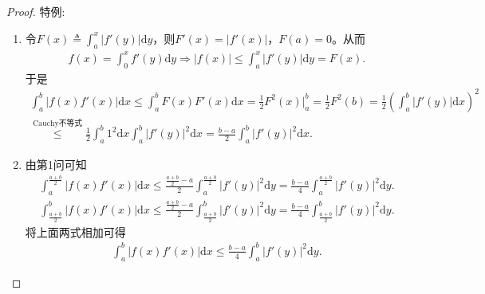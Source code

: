 \documentclass[../../main.tex]{subfiles}
\begin{document}
\begin{proof}
{\heiti 特例:}
\begin{enumerate}
\item 令\(F(x) \triangleq \int_{a}^{x}|f'(y)|\mathrm{d}y\)，则\(F'(x) = |f'(x)|\)，\(F(a) = 0\)。从而
\begin{align*}
f(x) = \int_{0}^{x}f'(y)\mathrm{d}y \Rightarrow |f(x)| \leqslant \int_{a}^{x}|f'(y)|\mathrm{d}y = F(x).
\end{align*}
于是
\begin{align*}
\int_{a}^{b}|f(x)f'(x)|\mathrm{d}x \leqslant \int_{a}^{b}F(x)F'(x)\mathrm{d}x = \frac{1}{2}F^2(x)\big|_{a}^{b} = \frac{1}{2}F^2(b) = \frac{1}{2}\left( \int_{a}^{b}|f'(y)|\mathrm{d}x \right)^2 \\
\overset{\text{Cauchy不等式}}{\leqslant} \frac{1}{2}\int_{a}^{b}1^2\mathrm{d}x \int_{a}^{b}|f'(y)|^2\mathrm{d}x = \frac{b - a}{2}\int_{a}^{b}|f'(y)|^2\mathrm{d}x.
\end{align*}

\item 由第1问可知
\begin{align*}
\int_{a}^{\frac{a + b}{2}}|f(x)f'(x)|\mathrm{d}x \leqslant \frac{\frac{a + b}{2} - a}{2}\int_{a}^{\frac{a + b}{2}}|f'(y)|^2\mathrm{d}y = \frac{b - a}{4}\int_{a}^{\frac{a + b}{2}}|f'(y)|^2\mathrm{d}y.
\end{align*}
\begin{align*}
\int_{\frac{a + b}{2}}^{b}|f(x)f'(x)|\mathrm{d}x \leqslant \frac{\frac{a + b}{2} - a}{2}\int_{\frac{a + b}{2}}^{b}|f'(y)|^2\mathrm{d}y = \frac{b - a}{4}\int_{\frac{a + b}{2}}^{b}|f'(y)|^2\mathrm{d}y.
\end{align*}
将上面两式相加可得
\begin{align*}
\int_{a}^{b}|f(x)f'(x)|\mathrm{d}x \leqslant \frac{b - a}{4}\int_{a}^{b}|f'(y)|^2\mathrm{d}y.
\end{align*}
\end{enumerate}


\end{proof}
\end{document}
